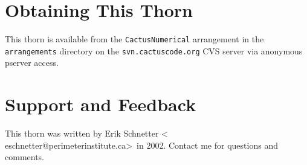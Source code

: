 \section{Obtaining This Thorn}

This thorn is available from the \texttt{CactusNumerical} arrangement in the
\texttt{arrangements} directory on the \texttt{svn.cactuscode.org}
CVS server via anonymous pserver access.


\section{Support and Feedback}

This thorn was written by Erik Schnetter \textless
eschnetter@perimeterinstitute.ca\textgreater\ in 2002.  Contact me for
questions and comments.



